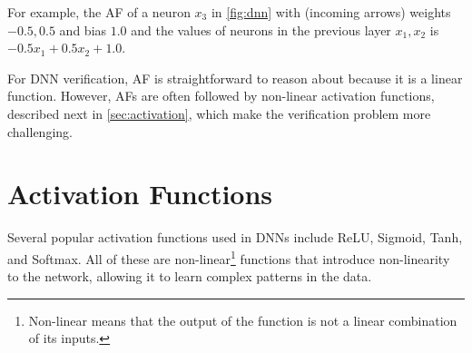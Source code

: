 \documentclass[oneside,11pt,dvipsnames]{book}
\begin{document}

For example, the AF of a neuron \(x_3\) in \autoref{fig:dnn} with (incoming arrows) weights \(-0.5, 0.5\) and bias \(1.0\) and the values of neurons in the previous layer \(x_1, x_2\) is \(-0.5x_1 + 0.5x_2 + 1.0\).

For DNN verification, AF is straightforward to reason about because it is a linear function. However, AFs are often followed by non-linear activation functions, described next in \autoref{sec:activation}, which make the verification problem more challenging.

\section{Activation Functions}\label{sec:activation}
Several popular activation functions used in DNNs include ReLU, Sigmoid, Tanh, and Softmax. All of these are non-linear\footnote{Non-linear means that the output of the function is not a linear combination of its inputs.} functions that introduce non-linearity to the network, allowing it to learn complex patterns in the data.
\end{document}
